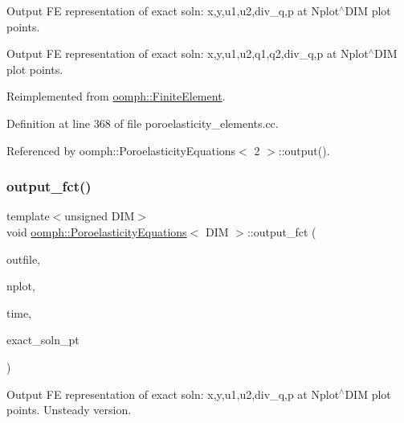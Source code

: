 Output FE representation of exact soln\+: x,y,u1,u2,div\+\_\+q,p at Nplot$^\wedge$\+D\+IM plot points. 

Output FE representation of exact soln\+: x,y,u1,u2,q1,q2,div\+\_\+q,p at Nplot$^\wedge$\+D\+IM plot points. 

Reimplemented from \hyperlink{classoomph_1_1FiniteElement_a22b695c714f60ee6cd145be348042035}{oomph\+::\+Finite\+Element}.



Definition at line 368 of file poroelasticity\+\_\+elements.\+cc.



Referenced by oomph\+::\+Poroelasticity\+Equations$<$ 2 $>$\+::output().

\mbox{\label{classoomph_1_1PoroelasticityEquations_af6ff5d6c420bb061faab9faedfa02938}} 
\subsubsection{\texorpdfstring{output\+\_\+fct()}{output\_fct()}\hspace{0.1cm}{\footnotesize\ttfamily [2/2]}}
{\footnotesize\ttfamily template$<$unsigned D\+IM$>$ \\
void \hyperlink{classoomph_1_1PoroelasticityEquations}{oomph\+::\+Poroelasticity\+Equations}$<$ D\+IM $>$\+::output\+\_\+fct (\begin{DoxyParamCaption}\item[{std\+::ostream \&}]{outfile,  }\item[{const unsigned \&}]{nplot,  }\item[{const double \&}]{time,  }\item[{\hyperlink{classoomph_1_1FiniteElement_ad4ecf2b61b158a4b4d351a60d23c633e}{Finite\+Element\+::\+Unsteady\+Exact\+Solution\+Fct\+Pt}}]{exact\+\_\+soln\+\_\+pt }\end{DoxyParamCaption})\hspace{0.3cm}{\ttfamily [virtual]}}



Output FE representation of exact soln\+: x,y,u1,u2,div\+\_\+q,p at Nplot$^\wedge$\+D\+IM plot points. Unsteady version. 



